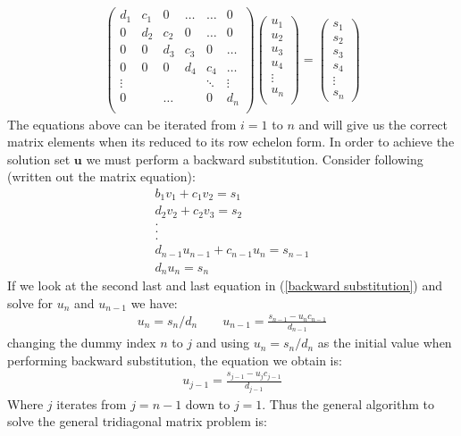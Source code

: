 \documentclass[a4paper, 10pt]{article}
\begin{document}
\begin{align}
  \begin{pmatrix}
    d_{1} & c_1 & 0 & \ldots &  \ldots & 0\\
    0 & d_{2} & c_2  & 0 & \ldots & 0\\
    0 & 0& d_3 &c_3 & 0 & \ldots \\
    0 & 0 & 0 & d_4 &c_4 &\ldots\\
    \vdots &  & &  &\ddots & \vdots \\
    0 && \ldots && 0 &  d_{n} \\
  \end{pmatrix}\begin{pmatrix}
    u_1\\
    u_2\\
    u_3\\
    u_4\\
    \vdots\\
    u_n\\
  \end{pmatrix}=
  \begin{pmatrix}
    s_{1}\\
    s_2\\
    s_{3}\\
    s_{4}\\
    \vdots\\
    s_{n}
  \end{pmatrix}
\end{align}
The equations above can be iterated from $i = 1$ to $n$ and will give us the correct matrix elements
when its reduced to its row echelon form. In order to achieve the solution set $\mathbf{u}$ we must
perform a backward substitution. Consider following (written out the matrix equation):
\begin{align}
  b_{1}v_{1} + c_{1}v_{2} = s_{1}
  \\
  d_{2}v_{2} + c_{2}v_{3} = s_{2}
  \\
  .
  \\
  .
  \\
  .
  \\
  d_{n-1}u_{n-1} + c_{n-1}u_{n} = s_{n-1}
  \\
  d_{n}u_{n} = s_{n}
  \label{backward substitution}
\end{align}
If we look at the second last and last equation in (\ref{backward substitution})
and solve for $u_{n}$ and $u_{n-1}$ we have:
\begin{align}
  u_{n} = s_{n}/d_{n} \qquad u_{n-1} = \frac{s_{n-1} - u_{n}c_{n-1}}{d_{n-1}}
\end{align}
changing the dummy index $n$ to $j$ and using $u_{n} = s_{n}/d_{n}$ as the initial value when performing
backward substitution, the equation we obtain is:
\begin{align}
  u_{j-1} = \frac{s_{j-1} - u_{j}c_{j-1}}{d_{j-1}}
\end{align}
Where $j$ iterates from $j = n-1$ down to $j = 1$. Thus the general algorithm to solve
the general tridiagonal matrix problem is:
\end{document}
